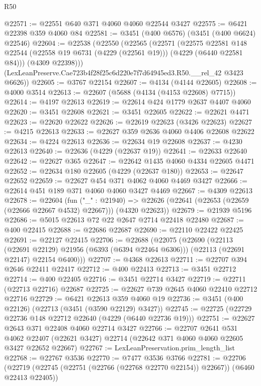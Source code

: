 \begin{lexlean}{R50}
\begin{coremodule}
@22571 := @22551 @640 @371 @4060 @4060 @22544 @3427
@22575 := @6421 @22398 @359 @4060 @84
@22581 := @3451 (@400 @6576) (@3451 (@400 @6624) @22546)
@22604 := @22538
    (@22550
      (@22565
        (@22571
          (@22575
            @22581
            @148
            @22544
            (@22558 @19 @6731 (@4229 (@22561 @19)))
            (@4229 (@6440 @22581 @84)))
          (@4309 @22398)))
      (LexLeanPreserve.Cae723b4f28f25c6d220e7f7d64945ed3.R50.__rel_42 @3423 @6626))
@22605 := @3767 @22154
@22607 := @4134 (@4144 @22605)
@22608 := @4000 @3514
@22613 := @22607 (@5688 (@4134 (@4153 @22608) @7715))
@22614 := @4197 @22613
@22619 := @22614 @424 @1779 @2637 @4407 @4060
@22620 := @3451 @22608
@22621 := @3451 @22605
@22622 := @22621 @4471
@22623 := @22620 @22622
@22626 := @22619 @22623 (@3426 @22623)
@22627 := @4215 @22613
@22633 := @22627 @359 @2636 @4060 @4406 @22608 @22622
@22634 := @4224 @22613
@22636 := @22634 @19 @22608
@22637 := @4230 @22613
@22640 := @22636 (@4229 (@22637 @19))
@22641 := @22633 @22640
@22642 := @22627 @365
@22647 := @22642 @1435 @4060 @4334 @22605 @4471
@22652 := @22634 @180 @22605 (@4229 (@22637 @180))
@22653 := @22647 @22652
@22659 := @22627 @454 @371 @4062 @4060 @4469 @3427
@22666 := @22614 @451 @189 @371 @4060 @4060 @3427 @4469
@22667 := @4309 @22613
@22678 := @22604
    (fun ("_" : @21940) =>
    @22626 (@22641 (@22653 (@22659 (@22666 @22667 @4532) @22667))) (@4320 @22623))
@22679 := @21939 @5196
@22686 := @5015 @22613 @72 @22 @2647 @2714 @22418 @22480
@22687 := @400 @22415
@22688 := @22686 @22687
@22690 := @22110 @22422 @22425
@22691 := @22127 @22415
@22706 := @22688
    (@22075
      (@22690
        (@22113 (@22691 @22129) @21956 (@6393 (@6394 @22464 @6306)))
        (@22113 (@22691 @22147) @22154 @6400)))
@22707 := @4368 @22613
@22711 := @22707 @394 @2646 @22411 @22417
@22712 := @400 @22413
@22713 := @3451 @22712
@22714 := @400 @22405
@22716 := @3451 @22714 @3427
@22719 := @22711 (@22713 @22716) @22687
@22725 := @22627 @739 @2645 @4060 @22410 @22712 @22716
@22729 := @6421 @22613 @359 @4060 @19
@22736 := @3451 (@400 @22126) (@22713 (@3451 (@3590 @22129) @3427))
@22745 := @22725 (@22729 @22736 @148 @22712 @22640 (@4229 (@6440 @22736 @19)))
@22751 := @22627 @2643 @371 @22408 @4060 @22714 @3427
@22766 := @22707
    @2641
    @531
    @4062
    @22407
    (@22621 @3427)
    @22714
    (@22642 @371 @4060 @4060 @22605 @3427 @22652 @22667)
@22767 := LexLeanPreservation.prim_length_list
@22768 := @22767 @3536
@22770 := @7477 @3536 @3766
@22781 := @22706
    (@22719 (@22745 (@22751 (@22766 (@22768 @22770 @22154)) @22667)) (@6460 @22413 @22405))

\end{coremodule}
\end{lexlean}
